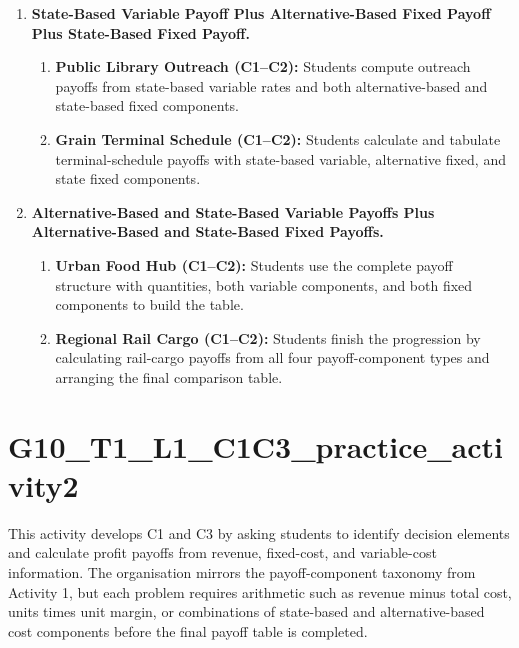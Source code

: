 \begin{enumerate}
		\item \textbf{State-Based Variable Payoff Plus Alternative-Based Fixed Payoff Plus State-Based Fixed Payoff.}
		\begin{enumerate}
			\item \textbf{Public Library Outreach (C1--C2):} Students compute outreach payoffs from state-based variable rates and both alternative-based and state-based fixed components.
			\item \textbf{Grain Terminal Schedule (C1--C2):} Students calculate and tabulate terminal-schedule payoffs with state-based variable, alternative fixed, and state fixed components.
		\end{enumerate}

		\item \textbf{Alternative-Based and State-Based Variable Payoffs Plus Alternative-Based and State-Based Fixed Payoffs.}
		\begin{enumerate}
			\item \textbf{Urban Food Hub (C1--C2):} Students use the complete payoff structure with quantities, both variable components, and both fixed components to build the table.
			\item \textbf{Regional Rail Cargo (C1--C2):} Students finish the progression by calculating rail-cargo payoffs from all four payoff-component types and arranging the final comparison table.
		\end{enumerate}
	\end{enumerate}

	\section{G10\_T1\_L1\_C1C3\_practice\_activity2}
	This activity develops C1 and C3 by asking students to identify decision elements and calculate profit payoffs from revenue, fixed-cost, and variable-cost information. The organisation mirrors the payoff-component taxonomy from Activity 1, but each problem requires arithmetic such as revenue minus total cost, units times unit margin, or combinations of state-based and alternative-based cost components before the final payoff table is completed.

